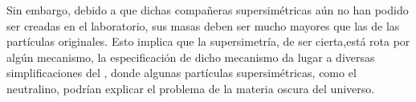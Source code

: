 Sin embargo, debido a que dichas compañeras supersimétricas aún no han podido ser creadas en el laboratorio, sus masas deben ser mucho mayores que las de las partículas originales. Esto implica que la supersimetría, de ser cierta,está rota por algún mecanismo, la especificación de dicho mecanismo da lugar a diversas simplificaciones del \MSSM, donde algunas partículas supersimétricas, como el neutralino, podrían explicar el problema de la materia oscura del universo.


